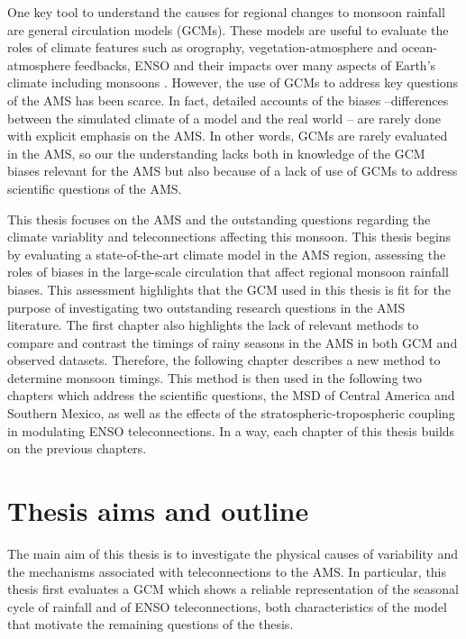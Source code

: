 
One key tool to understand the causes for regional changes to monsoon rainfall are general circulation models (GCMs). These models are useful to evaluate the roles of climate features such as orography, vegetation-atmosphere and ocean-atmosphere feedbacks, ENSO and their impacts over many aspects of Earth's climate including monsoons \citep{zhou2016}. However, the use of GCMs to address key questions of the AMS has been scarce. In fact, detailed accounts of the biases --differences between the simulated climate of a model and the real world -- are rarely done with explicit emphasis on the AMS. 
In other words, GCMs are rarely evaluated in the AMS, so our the understanding lacks both in knowledge of the GCM biases relevant for the AMS but also because of a lack of use of GCMs to address scientific questions of the AMS. 


 This thesis focuses on the AMS and the outstanding questions regarding the climate variablity and teleconnections affecting this monsoon.
 This thesis begins by evaluating a state-of-the-art climate model in the AMS region, assessing the roles of biases in the large-scale circulation that affect regional monsoon rainfall biases.
 This assessment highlights that the GCM used in this thesis is fit for the purpose of investigating two outstanding research questions in the AMS literature. The first chapter also highlights the lack of relevant methods to compare and contrast the timings of rainy seasons in the AMS in both GCM and observed datasets. Therefore, the following chapter describes a new method to determine monsoon timings. This method is then used in the following two chapters which address the scientific questions, the MSD of Central America and Southern Mexico, as well as the effects of the stratospheric-tropospheric coupling in modulating ENSO teleconnections.
  In a way, each chapter of this thesis builds on the previous chapters. 
 
\section{Thesis aims and outline}
The main aim of this thesis is to investigate the physical causes of variability and the mechanisms associated with teleconnections to the AMS.  In particular, this thesis first evaluates a GCM which shows a reliable representation of the seasonal cycle of rainfall and of ENSO teleconnections, both characteristics of the model that motivate the remaining questions of the thesis. %

